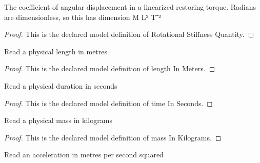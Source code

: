 \begin{definition}
  \label{def:physics:phyx-mini-0282:phyxminiproblems-problemphyxmini0282-rotationalstiffnessquantity}
  The coefficient of angular displacement in a linearized restoring torque. Radians are dimensionless, so this has dimension M L² T⁻²
\end{definition}
\begin{proof}
  This is the declared model definition of Rotational Stiffness Quantity.
\end{proof}
\begin{definition}
  \label{def:physics:phyx-mini-0282:phyxminiproblems-problemphyxmini0282-lengthinmeters}
  Read a physical length in metres
\end{definition}
\begin{proof}
  This is the declared model definition of length In Meters.
\end{proof}
\begin{definition}
  \label{def:physics:phyx-mini-0282:phyxminiproblems-problemphyxmini0282-timeinseconds}
  Read a physical duration in seconds
\end{definition}
\begin{proof}
  This is the declared model definition of time In Seconds.
\end{proof}
\begin{definition}
  \label{def:physics:phyx-mini-0282:phyxminiproblems-problemphyxmini0282-massinkilograms}
  Read a physical mass in kilograms
\end{definition}
\begin{proof}
  This is the declared model definition of mass In Kilograms.
\end{proof}
\begin{definition}
  \label{def:physics:phyx-mini-0282:phyxminiproblems-problemphyxmini0282-accelerationinmeterspersecondsquared}
  Read an acceleration in metres per second squared
\end{definition}
